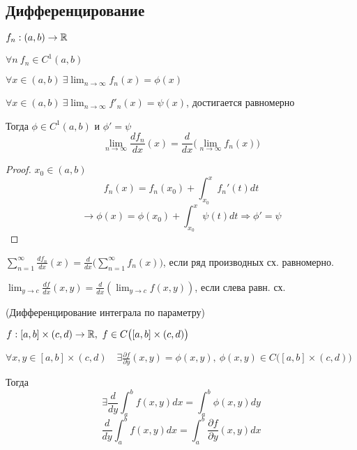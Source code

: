     \subsection*{Дифференцирование}

    \begin{theorem}
        $f_n : (a, b) \rightarrow \mathbb{R}$
        \par $\forall n \ f_n \in C^1(a, b)$
        \par $\forall x \in (a, b) \ \exists \lim_{n \rightarrow \infty} f_n(x) = \phi(x)$
        \par $\forall x \in (a, b) \ \exists \lim_{n \rightarrow \infty} f'_n(x) = \psi(x)$, достигается равномерно
        \par Тогда $\phi \in C^1(a, b)$ и $\phi' = \psi$
        \[
            \lim_{n \rightarrow \infty} \frac{d f_n}{dx}(x) = \frac{d}{dx}\Big(\lim_{n \rightarrow \infty} f_n(x)\Big)    
        \]
    \end{theorem}

    \begin{proof}
        $x_0 \in (a, b)$
        \[
            f_n(x) = f_n(x_0) + \int_{x_0}^x f_n'(t) dt    
        \]
        \[
           \longrightarrow \phi(x) = \phi(x_0) + \int_{x_0}^x \psi(t) dt \Rightarrow \phi' = \psi    
        \]
    \end{proof}

    \begin{corollary} %
        $\displaystyle
            \sum_{n=1}^\infty \frac{df_n}{dx}(x) = \frac{d}{dx}\Big(\sum_{n=1}^{\infty} f_n(x)\Big)    
        $, если ряд производных сх. равномерно.
    \end{corollary}

    \begin{corollary}
        $\displaystyle
            \lim_{y \rightarrow c} \frac{df}{dx}(x, y) = \frac{d}{dx}(\lim_{y \rightarrow c} f(x, y))
        $, если слева равн. сх.
    \end{corollary}

    \begin{theorem}(Дифференцирование интеграла по параметру)

        $f : [a, b] \times (c, d) \rightarrow \R, \ f \in C\big([a, b] \times (c, d)\big)$
        \par $\forall x, y \in [a, b] \times (c,d ) \quad \exists \frac{\partial f}{\partial y}(x,y) = \phi(x, y), \ \phi(x, y) \in C\big([a, b] \times (c, d)\big)$
        \par Тогда
        \[
            \exists \frac{d}{dy} \int_a^b f(x,y) dx = \int_a^b \phi(x, y)dy
        \]
        \[
            \frac{d}{dy} \int_a^b f(x, y)dx  = \int_a^b \frac{\partial f}{\partial y}(x, y)dx   
        \]
    \end{theorem}

